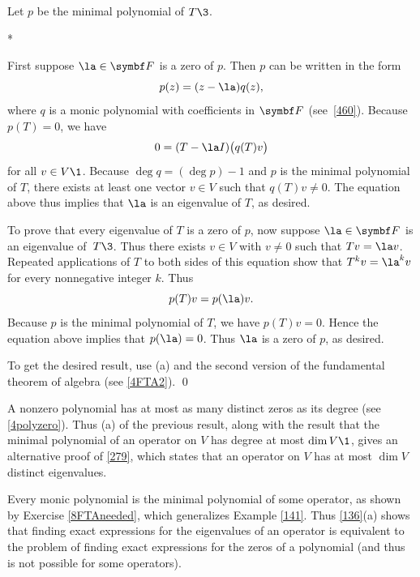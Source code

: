 \proof Let $p$ be the minimal polynomial of $T\3$.

\begin{subtheorem}*
\item
First suppose $\la \in \F{}$ is a zero of $p$. Then $p$ can be written in the form
\[
p(z) = (z - \la) q(z),
\]
where $q$ is a monic polynomial  with coefficients in $\F{}$ (see~\ref{460}).
Because $p(T) = 0$,  we have
\[
0 = (T - \la I)\paren[\big]{q(T)v}
\]
for all $v \in V\1$. Because $\deg q = (\deg p) - 1$ and $p$ is the minimal polynomial of $T$, there exists at least one vector $v \in V$ such that $q(T)v \ne 0$.  The equation above thus implies that $\la$ is an eigenvalue
of $T$, as desired.

To prove that every eigenvalue of $T$ is a zero of $p$, now suppose $\la \in \F{}$ is an eigenvalue
of~$T\3$. Thus there exists $v \in V$ with $v \ne 0$ such that $Tv = \la v$.  Repeated
applications of $T$ to both sides of this equation show that $T^k v = \la^k v$ for
every nonnegative integer $k$.  Thus
\[
p(T) v = p(\la) v.
\]
Because $p$ is the minimal polynomial of $T$, we have $p(T)v = 0$. Hence the equation above implies that $p(\la) = 0$. Thus $\la$ is a zero of $p$, as desired.
\item
To get the desired result, use (a) and the second version of the fundamental theorem of algebra (see \ref{4FTA2}).
\qed
\end{subtheorem}

A nonzero polynomial has at most as many distinct zeros as its degree (see \ref{4polyzero}). Thus (a) of the previous result, along with the result that the minimal polynomial of an operator on $V$ has degree at most $\dim V\1$, gives an alternative proof of \ref{279}, which states that an operator on $V$ has at most $\dim V$ distinct eigenvalues.

Every monic polynomial is the minimal polynomial of some operator, as shown by Exercise \ref{8FTAneeded}, which generalizes Example \ref{141}. Thus \ref{136}(a) shows that finding exact expressions for the eigenvalues of an operator is equivalent to the problem of finding exact expressions for the zeros of a polynomial (and thus is not possible for some operators).

